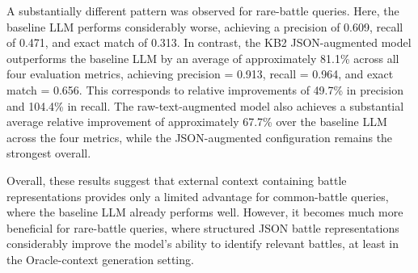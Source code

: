 A substantially different pattern was observed for rare-battle queries. Here, the baseline LLM performs considerably worse, achieving a precision of 0.609, recall of 0.471, and exact match of 0.313. In contrast, the KB2 JSON-augmented model outperforms the baseline LLM by an average of approximately 81.1\% across all four evaluation metrics, achieving precision = 0.913, recall = 0.964, and exact match = 0.656. This corresponds to relative improvements of 49.7\% in precision and 104.4\% in recall. The raw-text-augmented model also achieves a substantial average relative improvement of approximately 67.7\% over the baseline LLM across the four metrics, while the JSON-augmented configuration remains the strongest overall.

Overall, these results suggest that external context containing battle representations provides only a limited advantage for common-battle queries, where the baseline LLM already performs well. However, it becomes much more beneficial for rare-battle queries, where structured JSON battle representations considerably improve the model’s ability to identify relevant battles, at least in the Oracle-context generation setting.

